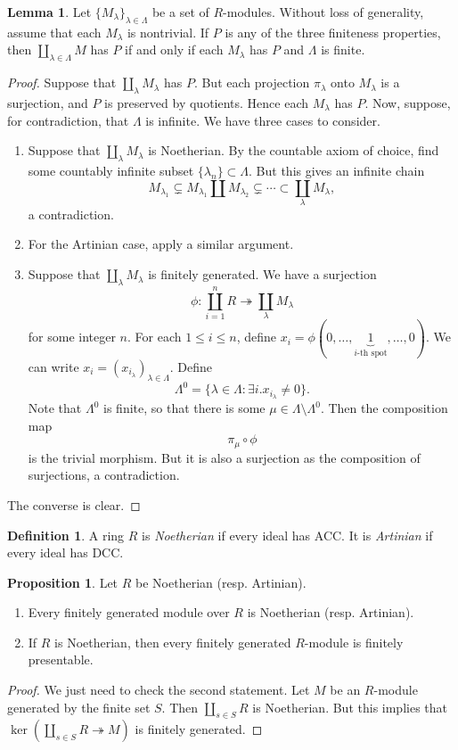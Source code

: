 \documentclass[10pt,letterpaper,cm]{nupset}
\theoremstyle{definition}
\newtheorem*{definition}{Definition}
\newtheorem{prop}{Proposition}
\newtheorem{lemma}{Lemma}
\newcommand{\1}{\mathbf{1}}
\newcommand{\0}{\vec 0}
\begin{document}
\begin{lemma}
Let $\{M_{\lambda}\}_{\lambda\in \Lambda}$ be a set of $R$-modules. Without loss of generality, assume that each $M_{\lambda}$ is nontrivial. If $P$ is any of the three finiteness properties, then $\coprod_{\lambda \in \Lambda} M$ has $P$  if and only if each $M_{\lambda}$ has $P$ and $\Lambda$ is finite.
\end{lemma}
\begin{proof} 
Suppose that $\coprod_{\lambda} M_{\lambda}$ has $P$. But each projection $\pi_{\lambda}$ onto $M_{\lambda}$ is a surjection, and $P$ is preserved by quotients. Hence each $M_{\lambda}$ has $P$. Now, suppose, for contradiction, that $\Lambda$ is infinite. We have three cases to consider.
\begin{enumerate}
\item Suppose that $\coprod_{\lambda} M_{\lambda}$ is Noetherian. By the countable axiom of choice, find some countably infinite subset $\{\lambda_n\}\subset \Lambda.$ But this gives an infinite chain $$M_{\lambda_1} \subsetneq M_{\lambda_1} \coprod M_{\lambda_2} \subsetneq \cdots \subset \coprod_{\lambda} M_{\lambda},$$ a contradiction.
\item For the Artinian case, apply a similar argument.
\item Suppose that $\coprod_{\lambda} M_{\lambda}$ is finitely generated. We have a surjection $$\phi: \coprod_{i=1}^n R \twoheadrightarrow \coprod_{\lambda} M_{\lambda}$$ for some integer $n$. For each $1\leq i\leq n$, define $x_i = \phi(0, \ldots, \underbrace{1}_{i\text{-th spot}}, \ldots, 0).$ We can write $x_i = (x_{i_{\lambda}})_{\lambda \in \Lambda}$. Define $$\Lambda^0 = \{\lambda \in \Lambda : \exists i. x_{i_\lambda}\ne 0 \} .$$ Note that $\Lambda^0$ is finite, so that there is some $\mu \in \Lambda \setminus \Lambda^0$.  Then the composition map $$\pi_{\mu} \circ \phi$$ is the trivial morphism. But it is also a surjection as the composition of surjections, a contradiction. 
\end{enumerate}
The converse is clear.
\end{proof}

\begin{definition}
A ring $R$ is \textit{Noetherian} if every ideal has  ACC. It is \textit{Artinian} if every ideal has DCC.
\end{definition}


\begin{prop} Let $R$ be Noetherian (resp. Artinian).
\begin{enumerate}
\item Every finitely generated module over $R$ is Noetherian (resp. Artinian).
\item If $R$ is Noetherian, then every finitely generated $R$-module is finitely presentable. 
\end{enumerate}
\end{prop}
\begin{proof}
We just need to check the second statement. Let $M$ be an $R$-module generated by the finite set $S$. Then  $\coprod_{s\in S} R$  is Noetherian. But this implies that $\ker(\coprod_{s\in S} R \twoheadrightarrow M)$ is finitely generated.
\end{proof}
\end{document}
